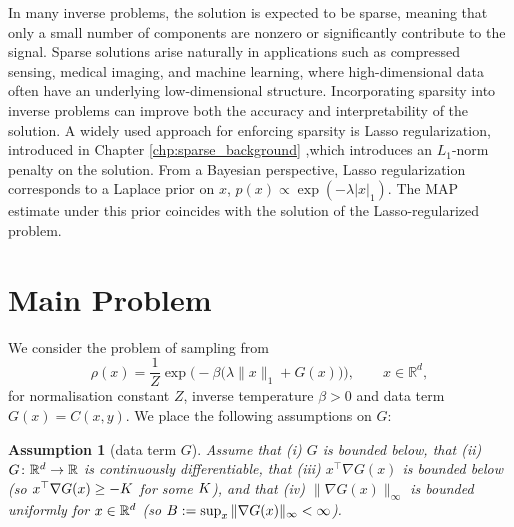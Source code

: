 \documentclass[11pt, twoside]{report}
\newtheorem{assumption}[theorem]{Assumption}
\begin{document}
In many inverse problems, the solution is expected to be sparse, meaning that only a small number of components are nonzero or significantly contribute to the signal. Sparse solutions arise naturally in applications such as compressed sensing, medical imaging, and machine learning, where high-dimensional data often have an underlying low-dimensional structure. Incorporating sparsity into inverse problems can improve both the accuracy and interpretability of the solution. A widely used approach for enforcing sparsity is Lasso regularization, introduced in Chapter \ref{chp:sparse_background} ,which introduces an $L_1$-norm penalty on the solution. From a Bayesian perspective, Lasso regularization corresponds to a Laplace prior on $x$, $p(x) \propto \exp(-\lambda |x|_1)$. The MAP estimate under this prior coincides with the solution of the Lasso-regularized problem.

\section{Main Problem}
We consider the problem of sampling from
\begin{equation}
\rho(x)=
\frac 1 Z\exp\bigl(-\beta\bigl(\lambda \|x\|_1 + G(x)\bigr)\bigr),\qquad x\in \mathbb{R}^d,\label{target}
\end{equation}
for normalisation constant $Z$, inverse temperature $\beta > 0$ and data term $G(x) = C(x,y)$. We place the following assumptions on $G$:
\begin{assumption}[data term $G$]\label{reg1} Assume that (i) $G$ is bounded below, that (ii) $G\colon \mathbb{R}^d\to \mathbb{R}$ is continuously differentiable, that  (iii) $x^\top\nabla G(x)$ is bounded below (so $x^\top\nabla G(x) \geq -K$ for some $K$), and that (iv)  $\|\nabla G(x)\|_\infty$ is bounded uniformly for $x\in \mathbb{R}^d$ (so $B := \sup_x\|\nabla G(x)\|_\infty < \infty$).
\end{assumption}
\end{document}
